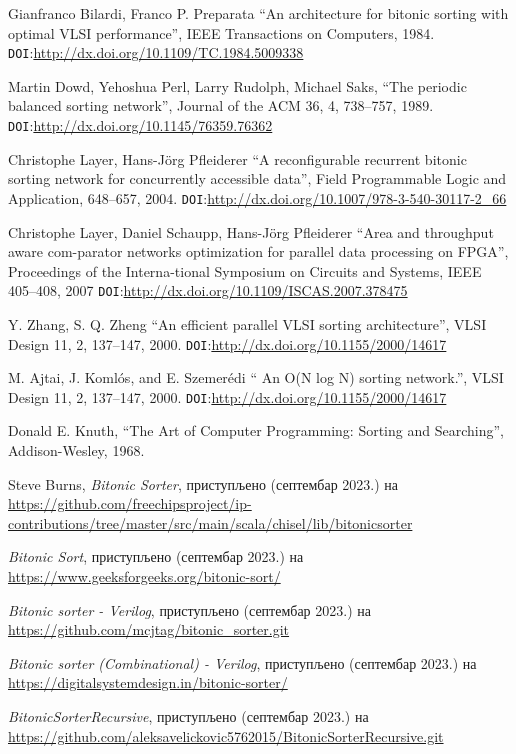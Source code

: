 \documentclass[12pt, a4paper]{article}
\theoremstyle{definition}
\begin{document}
\begin{thebibliography}{99}
 Gianfranco Bilardi, Franco P. Preparata
  ``An architecture for bitonic sorting with optimal VLSI performance'',
  IEEE Transactions on Computers, 1984.
  \verb+DOI+:\url{http://dx.doi.org/10.1109/TC.1984.5009338}

 Martin Dowd, Yehoshua Perl, Larry Rudolph, Michael Saks,
  ``The periodic balanced sorting network'',
  Journal of the ACM 36, 4, 738–757, 1989.
  \verb+DOI+:\url{http://dx.doi.org/10.1145/76359.76362}

 Christophe Layer, Hans-Jörg Pfleiderer
  ``A reconfigurable recurrent bitonic sorting network for concurrently accessible data'',
   Field Programmable Logic and Application, 648–657, 2004.
  \verb+DOI+:\url{http://dx.doi.org/10.1007/978-3-540-30117-2_66}

 Christophe Layer, Daniel Schaupp, Hans-Jörg Pfleiderer
  ``Area and throughput aware com-parator networks optimization for parallel data processing on FPGA'',
  Proceedings of the Interna-tional Symposium on Circuits and Systems, IEEE  405–408, 2007
  \verb+DOI+:\url{http://dx.doi.org/10.1109/ISCAS.2007.378475}

 Y. Zhang, S. Q. Zheng
  ``An efficient parallel VLSI sorting architecture'',
  VLSI Design 11, 2, 137–147, 2000.
  \verb+DOI+:\url{http://dx.doi.org/10.1155/2000/14617}

  M. Ajtai, J. Komlós, and E. Szemerédi
  `` An O(N log N) sorting network.'',
  VLSI Design 11, 2, 137–147, 2000.
  \verb+DOI+:\url{http://dx.doi.org/10.1155/2000/14617}

  Donald E. Knuth,
  ``The Art of Computer Programming: Sorting and Searching'',
  Addison-Wesley, 1968.

Steve Burns,
\textit{Bitonic Sorter}, приступљено (септембар 2023.) на
\url{https://github.com/freechipsproject/ip-contributions/tree/master/src/main/scala/chisel/lib/bitonicsorter}

\textit{Bitonic Sort}, приступљено (септембар 2023.) на
\url{https://www.geeksforgeeks.org/bitonic-sort/}

\textit{Bitonic sorter - Verilog}, приступљено (септембар 2023.) на
\url{https://github.com/mcjtag/bitonic_sorter.git}

\textit{Bitonic sorter (Combinational) - Verilog}, приступљено (септембар 2023.) на
\url{https://digitalsystemdesign.in/bitonic-sorter/}

\textit{BitonicSorterRecursive}, приступљено (септембар 2023.) на
\url{https://github.com/aleksavelickovic5762015/BitonicSorterRecursive.git}

\end{thebibliography}
\end{document}
